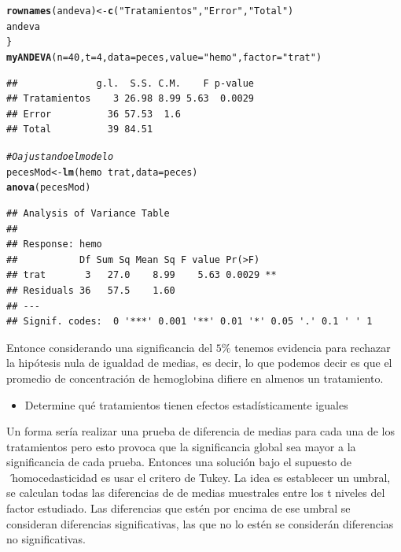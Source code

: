 \documentclass[a4paper]{scrartcl}\usepackage[]{graphicx}\usepackage[]{color}
\makeatletter
\newcommand{\hlnum}[1]{\textcolor[rgb]{0.686,0.059,0.569}{#1}}%
\newcommand{\hlstr}[1]{\textcolor[rgb]{0.192,0.494,0.8}{#1}}%
\newcommand{\hlcom}[1]{\textcolor[rgb]{0.678,0.584,0.686}{\textit{#1}}}%
\newcommand{\hlopt}[1]{\textcolor[rgb]{0,0,0}{#1}}%
\newcommand{\hlstd}[1]{\textcolor[rgb]{0.345,0.345,0.345}{#1}}%
\newcommand{\hlkwb}[1]{\textcolor[rgb]{0.69,0.353,0.396}{#1}}%
\newcommand{\hlkwc}[1]{\textcolor[rgb]{0.333,0.667,0.333}{#1}}%
\newcommand{\hlkwd}[1]{\textcolor[rgb]{0.737,0.353,0.396}{\textbf{#1}}}%
\newenvironment{kframe}{%
 \def\at@end@of@kframe{}%
 \ifinner\ifhmode%
  \def\at@end@of@kframe{\end{minipage}}%
  \begin{minipage}{\columnwidth}%
 \fi\fi%
 \def\FrameCommand##1{\hskip\@totalleftmargin \hskip-\fboxsep
 \colorbox{shadecolor}{##1}\hskip-\fboxsep
     \hskip-\linewidth \hskip-\@totalleftmargin \hskip\columnwidth}%
 \MakeFramed {\advance\hsize-\width
   \@totalleftmargin\z@ \linewidth\hsize
   \@setminipage}}%
 {\par\unskip\endMakeFramed%
 \at@end@of@kframe}
\newenvironment{knitrout}{}{} %
\makeatother
\begin{document}
\begin{knitrout}
\begin{kframe}
\begin{alltt}
    \hlkwd{rownames}\hlstd{(andeva)} \hlkwb{<-} \hlkwd{c}\hlstd{(}\hlstr{"Tratamientos"}\hlstd{,} \hlstr{"Error"}\hlstd{,} \hlstr{"Total"}\hlstd{)}
    \hlstd{andeva}
\hlstd{\}}
\hlkwd{myANDEVA}\hlstd{(}\hlkwc{n} \hlstd{=} \hlnum{40}\hlstd{,} \hlkwc{t} \hlstd{=} \hlnum{4}\hlstd{,} \hlkwc{data} \hlstd{= peces,} \hlkwc{value} \hlstd{=} \hlstr{"hemo"}\hlstd{,} \hlkwc{factor} \hlstd{=} \hlstr{"trat"}\hlstd{)}
\end{alltt}
\begin{verbatim}
##              g.l.  S.S. C.M.    F p-value
## Tratamientos    3 26.98 8.99 5.63  0.0029
## Error          36 57.53  1.6             
## Total          39 84.51
\end{verbatim}
\begin{alltt}
\hlcom{# O ajustando el modelo}
\hlstd{pecesMod} \hlkwb{<-} \hlkwd{lm}\hlstd{(hemo} \hlopt{~} \hlstd{trat,} \hlkwc{data} \hlstd{= peces)}
\hlkwd{anova}\hlstd{(pecesMod)}
\end{alltt}
\begin{verbatim}
## Analysis of Variance Table
## 
## Response: hemo
##           Df Sum Sq Mean Sq F value Pr(>F)   
## trat       3   27.0    8.99    5.63 0.0029 **
## Residuals 36   57.5    1.60                  
## ---
## Signif. codes:  0 '***' 0.001 '**' 0.01 '*' 0.05 '.' 0.1 ' ' 1
\end{verbatim}
\end{kframe}
\end{knitrout}

Entonce considerando una significancia del $5\%$ tenemos evidencia para rechazar la hipótesis nula de igualdad de medias, es decir, lo que podemos decir es que el promedio de concentración de hemoglobina difiere en almenos un tratamiento.


\begin{itemize}
  \item Determine qué tratamientos tienen efectos estadísticamente iguales
\end{itemize}

Un forma sería realizar una prueba de diferencia de medias para cada una de los tratamientos pero esto provoca que la significancia global sea mayor a la significancia de cada prueba. Entonces una solución bajo el supuesto de \emph´{homocedasticidad} es usar el critero de Tukey. La idea es establecer un umbral, se calculan todas las diferencias de de medias muestrales entre los t niveles del factor estudiado. Las diferencias que estén por encima de ese umbral se consideran diferencias significativas, las que no lo estén se considerán diferencias no significativas.
\end{document}
